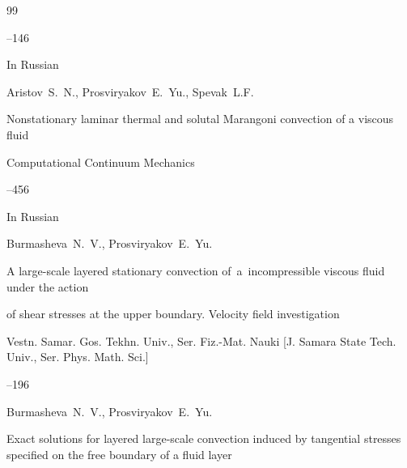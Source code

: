 \begin{thebibliography}{99}


--146










\lang In Russian


\by Aristov~S.~N., Prosviryakov~E.~Yu., Spevak~L.F.

\paper Nonstationary laminar thermal and solutal Marangoni convection of a viscous fluid

\jour  Computational Continuum Mechanics




--456










\lang In Russian

\by Burmasheva~N.~V., Prosviryakov~E.~Yu.

\paper A large-scale layered stationary convection of~a~incompressible viscous fluid under the action

of shear stresses at the upper boundary. Velocity field investigation

\jour Vestn. Samar. Gos. Tekhn. Univ., Ser. Fiz.-Mat. Nauki \rm [J. Samara State Tech. Univ., Ser. Phys. Math. Sci.]




--196







\by Burmasheva~N.~V.,  Prosviryakov~E.~Yu.

\paper Exact solutions for layered large-scale convection induced by tangential stresses specified on the free boundary of a fluid layer


\end{thebibliography}
